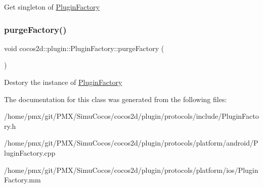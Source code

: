 Get singleton of \hyperlink{classcocos2d_1_1plugin_1_1PluginFactory}{Plugin\+Factory} \mbox{\label{classcocos2d_1_1plugin_1_1PluginFactory_a29ce7b2d50cdc816688ff0b5df959641}} 
\subsubsection{\texorpdfstring{purge\+Factory()}{purgeFactory()}}
{\footnotesize\ttfamily void cocos2d\+::plugin\+::\+Plugin\+Factory\+::purge\+Factory (\begin{DoxyParamCaption}{ }\end{DoxyParamCaption})\hspace{0.3cm}{\ttfamily [static]}}

Destory the instance of \hyperlink{classcocos2d_1_1plugin_1_1PluginFactory}{Plugin\+Factory} 

The documentation for this class was generated from the following files\+:\begin{DoxyCompactItemize}
\item 
/home/pmx/git/\+P\+M\+X/\+Simu\+Cocos/cocos2d/plugin/protocols/include/Plugin\+Factory.\+h\item 
/home/pmx/git/\+P\+M\+X/\+Simu\+Cocos/cocos2d/plugin/protocols/platform/android/Plugin\+Factory.\+cpp\item 
/home/pmx/git/\+P\+M\+X/\+Simu\+Cocos/cocos2d/plugin/protocols/platform/ios/Plugin\+Factory.\+mm\end{DoxyCompactItemize}
